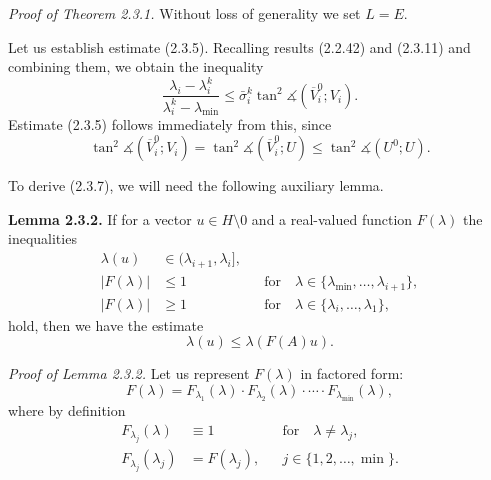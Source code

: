 \documentclass[11pt,oneside]{book}
\newcommand{\ang}{\measuredangle}
\begin{document}
\textit{Proof of Theorem 2.3.1.} Without loss of generality we set $L = E$.

Let us establish estimate (2.3.5). Recalling results (2.2.42) and (2.3.11) and combining them, we obtain the inequality
\[
\frac{\lambda_i - \lambda_i^k}{\lambda_i^k - \lambda_{\min}} \leqslant \bar{\sigma}_i^k \tan^2 \ang(\overline{V}_i^0; V_i). \tag{2.3.12}
\]
Estimate (2.3.5) follows immediately from this, since
\[
\tan^2 \ang(\overline{V}_i^0; V_i) = \tan^2 \ang(\overline{V}_i^0; U) \leqslant \tan^2 \ang(U^0; U).
\]

To derive (2.3.7), we will need the following auxiliary lemma.

\textbf{Lemma 2.3.2.} If for a vector $u \in H \setminus 0$ and a real-valued function $F(\lambda)$ the inequalities
\[
\begin{aligned}
\lambda(u) &\in (\lambda_{i+1}, \lambda_i], \\
|F(\lambda)| &\leqslant 1 && \text{for} \quad \lambda \in \{\lambda_{\min}, \ldots, \lambda_{i+1}\}, \\
|F(\lambda)| &\geqslant 1 && \text{for} \quad \lambda \in \{\lambda_i, \ldots, \lambda_1\},
\end{aligned}
\]
hold, then we have the estimate
\[
\lambda(u) \leqslant \lambda(F(A)u). \tag{2.3.13}
\]

\textit{Proof of Lemma 2.3.2.} Let us represent $F(\lambda)$ in factored form:
\[
F(\lambda) = F_{\lambda_1}(\lambda) \cdot F_{\lambda_2}(\lambda) \cdot \cdots \cdot F_{\lambda_{\min}}(\lambda),
\]
where by definition
\[
\begin{aligned}
F_{\lambda_j}(\lambda) &\equiv 1 && \text{for} \quad \lambda \neq \lambda_j, \\
F_{\lambda_j}(\lambda_j) &= F(\lambda_j), && j \in \{1, 2, \ldots, \min\}.
\end{aligned}
\]
\end{document}
